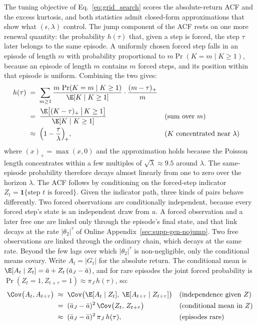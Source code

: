 The tuning objective of Eq.~\eqref{eq:grid_search} scores the
absolute-return ACF and the excess kurtosis, and both statistics
admit closed-form approximations that show what $(\epsilon, \lambda)$
control. The jump component of the ACF rests on one more renewal
quantity: the probability $h(\tau)$ that, given a step is forced, the
step $\tau$ later belongs to the same episode. A uniformly chosen
forced step falls in an episode of length $m$ with probability
proportional to $m \Pr(K = m \mid K \ge 1)$, because an episode of
length $m$ contains $m$ forced steps, and its position within that
episode is uniform. Combining the two gives:
\begin{align}
  h(\tau)
   &\;=\; \sum_{m \ge 1}
     \frac{m\, \Pr(K = m \mid K \ge 1)}{\E[K \mid K \ge 1]}
     \cdot \frac{(m - \tau)_+}{m}
     \notag \\
   &\;=\; \frac{\E\big[(K - \tau)_+ \,\big|\, K \ge 1\big]}
     {\E[K \mid K \ge 1]}
     && \text{(sum over $m$)} \notag \\
   &\;\approx\; \Big(1 - \frac{\tau}{\lambda}\Big)_{\!+},
     && \text{($K$ concentrated near $\lambda$)}
  \label{eq:supp-h}
\end{align}
where $(x)_+ = \max(x, 0)$ and the approximation holds because the
Poisson length concentrates within a few multiples of
$\sqrt{\lambda} \approx 9.5$ around $\lambda$. The same-episode
probability therefore decays almost linearly from one to zero over
the horizon $\lambda$. The ACF follows by conditioning on the
forced-step indicator $Z_t = \mathbf{1}\{\text{step $t$ is forced}\}$.
Given the indicator path, three kinds of pairs behave differently.
Two forced observations are conditionally independent, because every
forced step's state is an independent draw from $u$. A forced
observation and a later free one are linked only through the
episode's final state, and that link decays at the rate
$|\theta_2|^\tau$ of Online Appendix~\ref{sec:supp-gen-nojump}. Two
free observations are linked through the ordinary chain, which decays
at the same rate. Beyond the few lags over which $|\theta_2|^\tau$ is
non-negligible, only the conditional means covary. Write
$A_t = |G_t|$ for the absolute return. The conditional mean is
$\E[A_t \mid Z_t] = \bar a + Z_t\, (\bar a_J - \bar a)$,
and for rare episodes the joint forced probability is
$\Pr(Z_t = 1, Z_{t+\tau} = 1) \approx \pi_J\, h(\tau)$, so:
\begin{align}
  \Cov\big(A_t, A_{t+\tau}\big)
   &\;\approx\;
     \Cov\big(\E[A_t \mid Z_t],\;
              \E[A_{t+\tau} \mid Z_{t+\tau}]\big)
     && \text{(independence given $Z$)} \notag \\
   &\;=\; (\bar a_J - \bar a)^2\,
     \Cov\big(Z_t,\, Z_{t+\tau}\big)
     && \text{(conditional mean in $Z$)} \notag \\
   &\;\approx\; (\bar a_J - \bar a)^2\, \pi_J\, h(\tau),
     && \text{(episodes rare)}
  \label{eq:supp-acf-wj}
\end{align}
